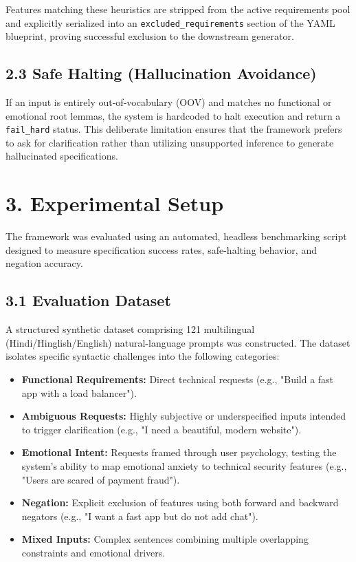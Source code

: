 \documentclass[11pt,a4paper]{article}
\begin{document}
Features matching these heuristics are stripped from the active requirements pool and explicitly serialized into an \texttt{excluded_requirements} section of the YAML blueprint, proving successful exclusion to the downstream generator.

\subsection{2.3 Safe Halting (Hallucination Avoidance)}
If an input is entirely out-of-vocabulary (OOV) and matches no functional or emotional root lemmas, the system is hardcoded to halt execution and return a \texttt{fail_hard} status. This deliberate limitation ensures that the framework prefers to ask for clarification rather than utilizing unsupported inference to generate hallucinated specifications.



\section{3. Experimental Setup}

The framework was evaluated using an automated, headless benchmarking script designed to measure specification success rates, safe-halting behavior, and negation accuracy.

\subsection{3.1 Evaluation Dataset}
A structured synthetic dataset comprising 121 multilingual (Hindi/Hinglish/English) natural-language prompts was constructed. The dataset isolates specific syntactic challenges into the following categories:
\begin{itemize}
    \item \textbf{Functional Requirements:} Direct technical requests (e.g., "Build a fast app with a load balancer").
    \item \textbf{Ambiguous Requests:} Highly subjective or underspecified inputs intended to trigger clarification (e.g., "I need a beautiful, modern website").
    \item \textbf{Emotional Intent:} Requests framed through user psychology, testing the system's ability to map emotional anxiety to technical security features (e.g., "Users are scared of payment fraud").
    \item \textbf{Negation:} Explicit exclusion of features using both forward and backward negators (e.g., "I want a fast app but do not add chat").
    \item \textbf{Mixed Inputs:} Complex sentences combining multiple overlapping constraints and emotional drivers.
\end{itemize}
\end{document}
